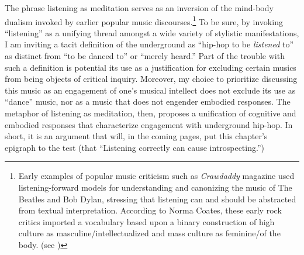 The phrase listening as meditation serves as an inversion of the mind-body dualism invoked by 
earlier popular music discourses.\footnote{
    Early examples of popular music criticism such as \textit{Crawdaddy} magazine used 
    listening-forward models for understanding and canonizing the music of The Beatles and Bob
    Dylan, stressing that listening can and should be abstracted from textual interpretation.
    According to Norma Coates, these early rock critics imported a vocabulary based upon a
    binary construction of high culture as masculine/intellectualized and mass culture
    as feminine/of the body. (see \autocite[66\textit{ff}.]{coatesTeenyboppers2009})}
To be sure, by invoking ``listening'' as a unifying thread amongst a wide variety of stylistic 
manifestations, I am inviting a tacit definition of the underground as ``hip-hop to be 
\emph{listened} to'' as distinct from ``to be danced to'' or ``merely heard.'' Part of the 
trouble with such a definition is potential its use as a justification  for excluding certain
musics from being objects of critical inquiry. Moreover, my choice to prioritize discussing 
this music as an engagement of one's musical intellect does not exclude its use as ``dance'' 
music, nor as a music that does not engender embodied responses. The metaphor of listening 
as meditation, then, proposes a unification of cognitive and embodied responses that characterize
engagement with underground hip-hop. In short, it is an argument that will, in the coming pages,
put this chapter's epigraph to the test (that ``Listening correctly can cause introspecting.'')

